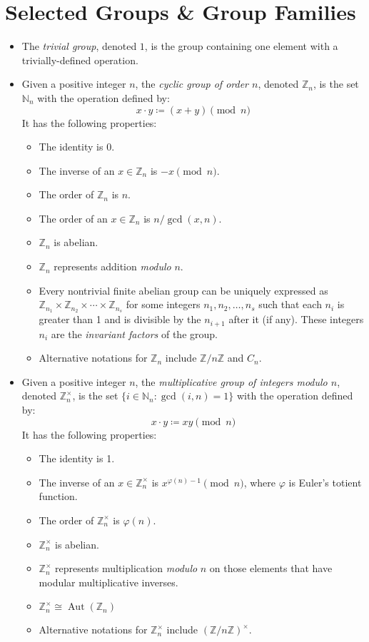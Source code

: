 \documentclass{article}
\newcommand{\N}{\mathbb{N}}
\newcommand{\Z}{\mathbb{Z}}
\DeclareMathOperator{\Aut}{Aut}
\begin{document}
\section{Selected Groups \& Group Families}
\begin{itemize}
\item The \emph{trivial group}, denoted $1$, is the group containing one element with a trivially-defined operation.

\item Given a positive integer $n$, the \emph{cyclic group of order $n$}, denoted $\Z_n$, is the set $\N_n$ with the operation defined by: $$x\cdot y\coloneqq (x+y)\pmod{n}$$  It has the following properties:
 \begin{itemize}
 \item The identity is 0.
 \item The inverse of an $x\in\Z_n$ is $-x\pmod{n}$.
 \item The order of $\Z_n$ is $n$.
 \item The order of an $x\in\Z_n$ is $n/\gcd(x,n)$.
 \item $\Z_n$ is abelian.
 \item $\Z_n$ represents addition \emph{modulo} $n$.
 \item Every nontrivial finite abelian group can be uniquely expressed as $\Z_{n_1}\times\Z_{n_2}\times\cdots\times\Z_{n_s}$ for some integers $n_1, n_2, \ldots, n_s$ such that each $n_i$ is greater than 1 and is divisible by the $n_{i+1}$ after it (if any).  These integers $n_i$ are the \emph{invariant factors} of the group.
 \item Alternative notations for $\Z_n$ include $\Z/n\Z$ and $C_n$.
 \end{itemize}

\item Given a positive integer $n$, the \emph{multiplicative group of integers \emph{modulo} $n$}, denoted $\Z_n^\times$, is the set $\{i\in\N_n : \gcd(i,n) = 1\}$ with the operation defined by: $$x\cdot y\coloneqq xy\pmod{n}$$  It has the following properties:
 \begin{itemize}
 \item The identity is 1.
 \item The inverse of an $x\in\Z_n^\times$ is $x^{\varphi(n)-1}\pmod{n}$, where $\varphi$ is Euler's totient function.
 \item The order of $\Z_n^\times$ is $\varphi(n)$.
 \item $\Z_n^\times$ is abelian.
 \item $\Z_n^\times$ represents multiplication \emph{modulo} $n$ on those elements that have modular multiplicative inverses.
 \item $\Z_n^\times \cong \Aut(\Z_n)$
 \item Alternative notations for $\Z_n^\times$ include $(\Z/n\Z)^\times$.
 \end{itemize}


\end{itemize}
\end{document}
